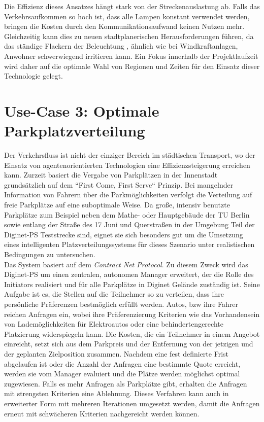 Die Effizienz dieses Ansatzes hängt stark von der Streckenauslastung ab. Falls das Verkehrsaufkommen so hoch ist, dass alle Lampen konstant verwendet werden, bringen die Kosten durch den Kommunikationsaufwand keinen Nutzen mehr. Gleichzeitig kann dies zu neuen stadtplanerischen Herausforderungen führen, da das ständige Flackern der Beleuchtung , ähnlich wie bei Windkraftanlagen, Anwohner schwerwiegend irritieren kann. Ein Fokus innerhalb der Projektlaufzeit wird daher auf die optimale Wahl von Regionen und Zeiten für den Einsatz dieser Technologie gelegt.

\section*{Use-Case 3: Optimale Parkplatzverteilung}
Der Verkehrsfluss ist nicht der einziger Bereich im städtischen Transport, wo der Einsatz von agentenorientierten Technologien eine Effizienzsteigerung erreichen kann. Zurzeit basiert die Vergabe von Parkplätzen in der Innenstadt grundsätzlich auf dem ``First Come, First Serve`` Prinzip. Bei mangelnder Information von Fahrern über die Parkmöglichkeiten verfolgt die Verteilung auf freie Parkplätze auf eine suboptimale Weise. Da große, intensiv benutzte Parkplätze zum Beispiel neben dem Mathe- oder Hauptgebäude der TU Berlin sowie entlang der Straße des 17 Juni und Querstraßen in der Umgebung  Teil der Diginet-PS Teststrecke sind, eignet sie sich besonders gut um die Umsetzung eines intelligenten Platzverteilungssystems für dieses Szenario unter realistischen Bedingungen zu untersuchen.\\

Das System basiert auf dem \textit{Contract Net Protocol}. Zu diesem Zweck wird das Diginet-PS um einen zentralen, autonomen Manager erweitert, der die Rolle des Initiators realisiert und für alle Parkplätze in Diginet Gelände zuständig ist. Seine Aufgabe ist es, die Stellen auf die Teilnehmer so zu verteilen, dass ihre persönliche Präferenzen bestmöglich erfüllt werden. Autos, bzw ihre Fahrer reichen Anfragen ein, wobei ihre Präferenzierung Kriterien wie das Vorhandensein von Lademöglichkeiten für Elektroautos oder eine behindertengerechte Platzierung widerspiegeln kann. Die Kosten, die ein Teilnehmer in einem Angebot einreicht, setzt sich aus dem Parkpreis und der Entfernung von der jetzigen und der geplanten Zielposition zusammen. Nachdem eine fest definierte Frist abgelaufen ist oder die Anzahl der Anfragen eine bestimmte Quote erreicht, werden sie vom Manager evaluiert und die Plätze werden möglichst optimal zugewiesen. Falls es mehr Anfragen als Parkplätze gibt, erhalten die Anfragen mit strengsten Kriterien eine Ablehnung. Dieses Verfahren kann auch in erweiterter Form mit mehreren Iterationen umgesetzt werden, damit die Anfragen erneut mit schwächeren Kriterien nachgereicht werden können.\\


